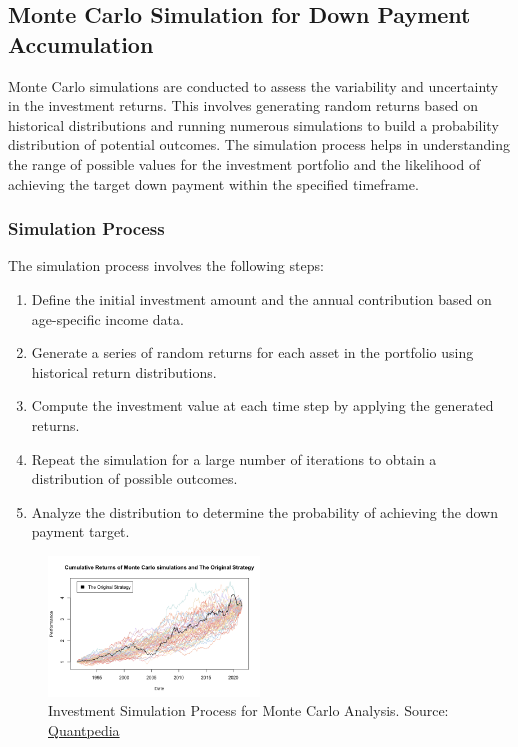 \subsection{Monte Carlo Simulation for Down Payment Accumulation}
Monte Carlo simulations are conducted to assess the variability and uncertainty in the investment returns. This involves generating random returns based on historical distributions and running numerous simulations to build a probability distribution of potential outcomes. The simulation process helps in understanding the range of possible values for the investment portfolio and the likelihood of achieving the target down payment within the specified timeframe.

\subsubsection{Simulation Process}
The simulation process involves the following steps:
\begin{enumerate}
    \item Define the initial investment amount and the annual contribution based on age-specific income data.
    \item Generate a series of random returns for each asset in the portfolio using historical return distributions.
    \item Compute the investment value at each time step by applying the generated returns.
    \item Repeat the simulation for a large number of iterations to obtain a distribution of possible outcomes.
    \item Analyze the distribution to determine the probability of achieving the down payment target.
\end{enumerate}



\begin{figure}[h]
\centering
\includegraphics[width=0.5\textwidth]{investment_simulation_process.png}
\caption{Investment Simulation Process for Monte Carlo Analysis. Source: \href{https://quantpedia.com/introduction-and-examples-of-monte-carlo-strategy-simulation/}{Quantpedia}}
\label{fig:simulation_process}
\end{figure}







